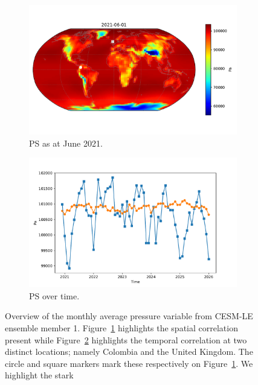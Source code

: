 \begin{figure}[htbp!] 
	\centering
	\begin{subfigure}[b]{0.45\textwidth}
		\includegraphics[width=\textwidth]{PS_example}
		\caption{PS as at June 2021.}
		\label{fig:pressure_june}   
	\end{subfigure}             
	\begin{subfigure}[b]{0.45\textwidth}
		\includegraphics[width=\textwidth]{PS_example_temp}
		\caption{PS  over time.}
		\label{fig:pressure_temp}
	\end{subfigure}             
	\caption[Overview of Pressure variable]{Overview of the monthly average pressure variable from CESM-LE ensemble member 1. Figure~\ref{fig:pressure_june} highlights the spatial correlation present while Figure~\ref{fig:pressure_temp} highlights the temporal correlation at two distinct locations; namely Colombia and the United Kingdom. The circle and square markers mark these respectively on Figure~\ref{fig:pressure_june}. We highlight the stark }
	\label{fig:pressure_overview}
\end{figure}

